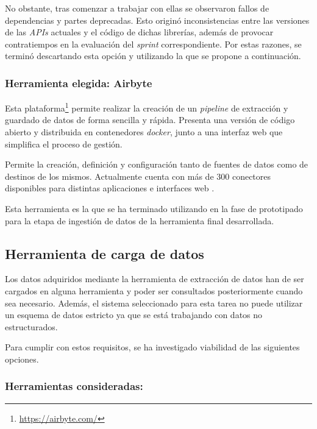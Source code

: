 No obstante, tras comenzar a trabajar con ellas se observaron fallos de dependencias y partes deprecadas. Esto originó inconsistencias entre las versiones de las \textit{APIs} actuales y el código de dichas librerías, además de provocar contratiempos en la evaluación del \textit{sprint} correspondiente. Por estas razones, se terminó descartando esta opción y utilizando la que se propone a continuación. 

\subsubsection{Herramienta elegida: Airbyte}

Esta plataforma\footnote{\url{https://airbyte.com/}} permite realizar la creación de un \textit{pipeline} de extracción y guardado de datos de forma sencilla y rápida. Presenta una versión de código abierto y distribuida en contenedores \textit{docker}, junto a una interfaz web que simplifica el proceso de gestión.

Permite la creación, definición y configuración tanto de fuentes de datos como de destinos de los mismos. Actualmente cuenta con más de 300 conectores disponibles para distintas aplicaciones e interfaces web \cite{airbyteConnectors}.

Esta herramienta es la que se ha terminado utilizando en la fase de prototipado para la etapa de ingestión de datos de la herramienta final desarrollada.

\subsection{Herramienta de carga de datos}

Los datos adquiridos mediante la herramienta de extracción de datos han de ser cargados en alguna herramienta y poder ser consultados posteriormente cuando sea necesario. Además, el sistema seleccionado para esta tarea no puede utilizar un esquema de datos estricto ya que se está trabajando con datos no estructurados.

Para cumplir con estos requisitos, se ha investigado viabilidad de las siguientes opciones.

\subsubsection{Herramientas consideradas:}

